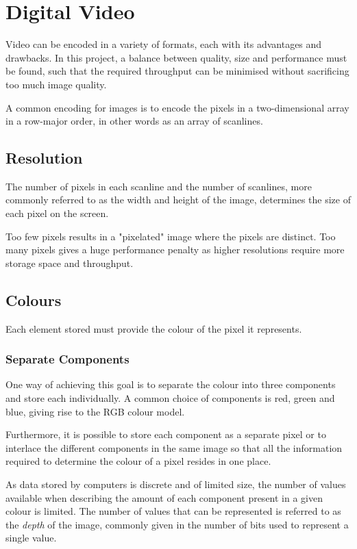 \section{Digital Video} \label{sec:DigitalVideo}
Video can be encoded in a variety of formats, each with its advantages and drawbacks.
In this project, a balance between quality, size and performance must be found,
such that the required throughput can be minimised without sacrificing too much image quality.

A common encoding for images is to encode the pixels in a two-dimensional array in a row-major order, in other words as an array of scanlines.

\subsection{Resolution}
The number of pixels in each scanline and the number of scanlines, more commonly referred to as the width and height of the image, determines the size of each pixel on the screen.

Too few pixels results in a "pixelated" image where the pixels are distinct.
Too many pixels gives a huge performance penalty as higher resolutions require more storage space and throughput.

\subsection{Colours}
Each element stored must provide the colour of the pixel it represents.

\subsubsection{Separate Components}
One way of achieving this goal is to separate the colour into three components and store each individually.
A common choice of components is red, green and blue, giving rise to the RGB colour model.

Furthermore, it is possible to store each component as a separate pixel or to interlace the different components in the same image so that all the information required to determine the colour of a pixel resides in one place.

As data stored by computers is discrete and of limited size, the number of values available when describing the amount of each component present in a given colour is limited.
The number of values that can be represented is referred to as the \textit{depth} of the image, commonly given in the number of bits used to represent a single value.

